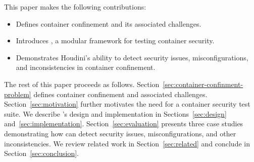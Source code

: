 

This paper makes the following contributions:
\begin{itemize}
    \item Defines container confinement and its associated challenges.
    \item Introduces \houdini, a modular framework for testing container security.
    \item Demonstrates Houdini's ability to detect security issues, misconfigurations, and inconsistencies in container confinement.
\end{itemize}

The rest of this paper proceeds as follows. Section~\ref{sec:container-confinment-problem} defines container confinement and associated challenges. Section~\ref{sec:motivation} further motivates the need for a container security test suite. We describe \houdini's design and implementation in Sections~\ref{sec:design} and~\ref{sec:implementation}. Section~\ref{sec:evaluation} presents three case studies demonstrating how \houdini can detect security issues, misconfigurations, and other inconsistencies. We review related work in Section~\ref{sec:related} and conclude in Section~\ref{sec:conclusion}.
